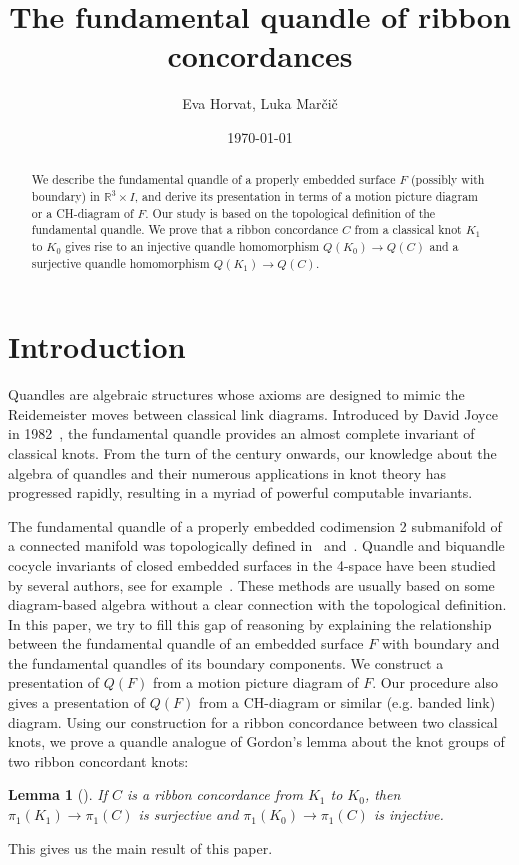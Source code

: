 \documentclass[a4paper,12pt]{amsart}
\title{The fundamental quandle of ribbon concordances}
\author{Eva Horvat, Luka Marčič}
\date{\today}
\numberwithin{equation}{section}
\theoremstyle{plain}
\newtheorem{lemma}[theorem]{Lemma}
\theoremstyle{definition}
\newcommand{\RR}{\mathbb{R}}
\begin{document}
\begin{abstract}
	We describe the fundamental quandle of a properly embedded surface $F$ (possibly with boundary) in $\RR ^{3}\times I$, 
	and derive its presentation in terms of a motion picture diagram or a CH-diagram of $F$. 
	Our study is based on the topological definition of the fundamental quandle. 
	We prove that a ribbon concordance $C$ from a classical knot $K_1$ to $K_0$ gives rise to an injective quandle homomorphism 
	$Q(K_0)\to Q(C)$ and a surjective quandle homomorphism $Q(K_1)\to Q(C)$.
\end{abstract}

\maketitle
	


\section{Introduction}
Quandles are algebraic structures whose axioms are designed to mimic the Reidemeister moves between classical link diagrams. 
Introduced by David Joyce in 1982~\cite{J}, the fundamental quandle provides an almost complete invariant of classical knots. 
From the turn of the century onwards, our knowledge about the algebra of quandles and their numerous applications in knot theory has progressed rapidly,
resulting in a myriad of powerful computable invariants.



The fundamental quandle of a properly embedded codimension 2 submanifold of a connected manifold was topologically defined in~\cite{J} and~\cite{FR}. 
Quandle and biquandle cocycle invariants of closed embedded surfaces in the 4-space have been studied by several authors, see for example~\cite{CKS1}. 
These methods are usually based on some diagram-based algebra without a clear connection with the topological definition. 
In this paper, we try to fill this gap of reasoning by explaining the relationship between the fundamental quandle of an embedded surface $F$ with boundary and the fundamental quandles of its boundary components. 
We construct a presentation of $Q(F)$ from a motion picture diagram of $F$. 
Our procedure also gives a presentation of $Q(F)$ from a CH-diagram or similar (e.g. banded link) diagram. 
Using our construction for a ribbon concordance between two classical knots, we prove a quandle analogue of Gordon's lemma about the knot groups of two ribbon concordant knots:  
\begin{lemma}[\cite{G}]
	\label{lemma:gordon}
	If $C$ is a ribbon concordance from $K_1$ to $K_0$, then $\pi _{1}(K_1)\to \pi _{1}(C)$ is surjective and $\pi _{1}(K_0)\to \pi _{1}(C)$ is injective. 
\end{lemma}
This gives us the main result of this paper.
\end{document}
